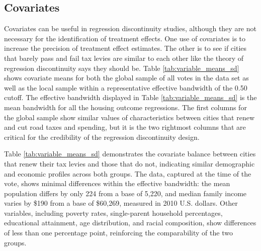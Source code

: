 \subsection{Covariates}

Covariates can be useful in regression discontinuity studies, although they are not necessary for the identification of treatment effects.  One use of covariates is to increase the precision of treatment effect estimates.  The other is to see if cities that barely pass and fail tax levies are similar to each other like the theory of regression discontinuity says they should be. Table \ref{tab:variable_means_sd} shows covariate means for both the global sample of all votes in the data set as well as the local sample within a representative effective bandwidth of the 0.50 cutoff. The effective bandwidth displayed in Table \ref{tab:variable_means_sd} is the mean bandwidth for all the housing outcome regressions. The first columns for the global sample show similar values of characteristics between cities that renew and cut road taxes and spending, but it is the two rightmost columns that are critical for the credibility of the regression discontinuity design.   

Table \ref{tab:variable_means_sd} demonstrates the covariate balance between cities that renew their tax levies and those that do not, indicating similar demographic and economic profiles across both groups. The data, captured at the time of the vote, shows minimal differences within the effective bandwidth: the mean population differs by only 224 from a base of 5,220, and median family income varies by \$190 from a base of \$60,269, measured in 2010 U.S. dollars. Other variables, including poverty rates, single-parent household percentages, educational attainment, age distribution, and racial composition, show differences of less than one percentage point, reinforcing the comparability of the two groups.


